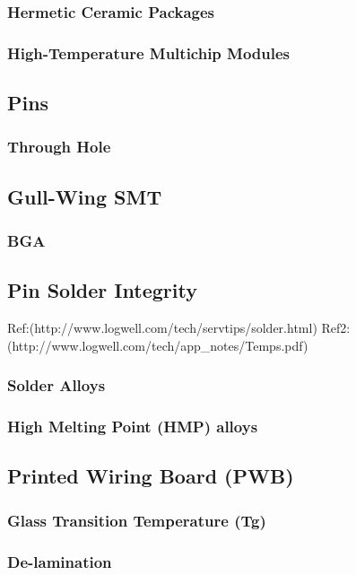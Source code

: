 \documentclass{article}
\begin{document}
		\subsubsection{Hermetic Ceramic Packages}
		\subsubsection{High-Temperature Multichip Modules}
	
	\subsection{Pins}
		\subsubsection{Through Hole}
		\subsection{Gull-Wing SMT}
		\subsubsection{BGA}
	
	\subsection{Pin Solder Integrity}
		Ref:(http://www.logwell.com/tech/servtips/solder.html)
		Ref2:(http://www.logwell.com/tech/app_notes/Temps.pdf)
		\subsubsection{Solder Alloys}
		\subsubsection{High Melting Point (HMP) alloys}
	
	\subsection{Printed Wiring Board (PWB)}
		\subsubsection{Glass Transition Temperature (Tg)}
		\subsubsection{De-lamination}
\end{document}
